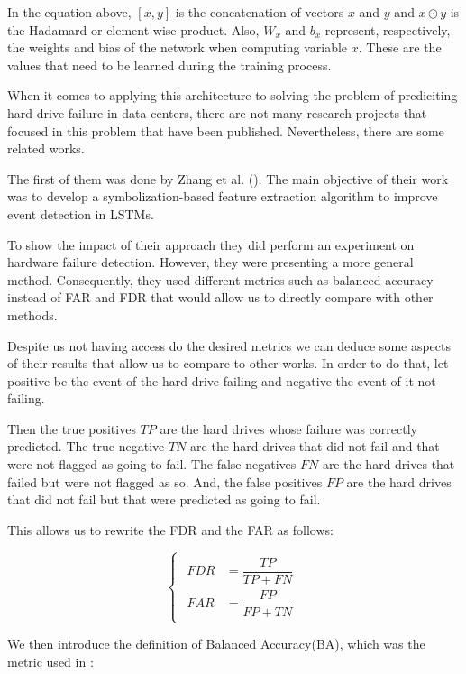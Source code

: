 In the equation above, $[x, y]$ is the concatenation of vectors $x$ and $y$ and $x \odot y$ is the Hadamard or element-wise product.
Also, $W_x$ and $b_x$ represent, respectively, the weights and bias of the network when computing variable $x$.
These are the values that need to be learned during the training process.

When it comes to applying this architecture to solving the problem of prediciting hard drive failure in data centers, there are not many research projects that focused in this problem that have been published.
Nevertheless, there are some related works.

The first of them was done by Zhang et al. (\cite{zhang2017deep}).
The main objective of their work was to develop a symbolization-based feature extraction algorithm to improve event detection in LSTMs.

To show the impact of their approach they did perform an experiment on hardware failure detection.
However, they were presenting a more general method.
Consequently, they used different metrics such as balanced accuracy instead of FAR and FDR that would allow us to directly compare with other methods.

Despite us not having access do the desired metrics we can deduce some aspects of their results that allow us to compare to other works.
In order to do that, let positive be the event of the hard drive failing and negative the event of it not failing.

Then the true positives $TP$ are the hard drives whose failure was correctly predicted.
The true negative $TN$ are the hard drives that did not fail and that were not flagged as going to fail.
The false negatives $FN$ are the hard drives that failed but were not flagged as so.
And, the false positives $FP$ are the hard drives that did not fail but that were predicted as going to fail.

This allows us to rewrite the FDR and the FAR as follows:

\begin{equation}
    \begin{cases}
        \begin{aligned}
            FDR &= \dfrac{TP}{TP + FN} \\
            FAR &= \dfrac{FP}{FP + TN}
        \end{aligned}
    \end{cases}
\end{equation}

We then introduce the definition of Balanced Accuracy(BA), which was the metric used in \cite{zhang2017deep}:

